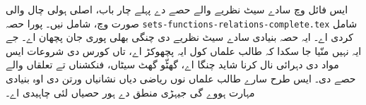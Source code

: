 \documentclass[../../include/open-logic-part]{subfiles}
\begin{document}

\begin{editorial}
  ایس فائل وچ سادے سیٹ نظریے والے حصے دے پہلے چار باب، اصلی ہولی چال والی صورت وچ، شامل نیں۔ پورا حصہ \verb|sets-functions-relations-complete.tex| شامل کردی اے۔ ایہ حصہ بنیادی سادے سیٹ نظریے دی چنگی بھلی پوری جان پچھان اے۔ جے ایہ نہیں منّیا جا سکدا کہ طالب علماں کول ایہ پچھوکڑ اے، تاں کورس دی شروعات ایس مواد دی دہرائی نال کرنا شاید چنگا اے، گھٹّو گھٹ سیٹاں، فنکشناں تے تعلقاں والے حصے دی۔ ایس طرح سارے طالب علماں نوں ریاضی دیاں نشانیاں ورتن دی اوہ بنیادی مہارت ہووے گی جیہڑی منطق دے ہور حصیاں لئی چاہیدی اے۔
\end{editorial}





\OLEndPartHook
\end{document}
